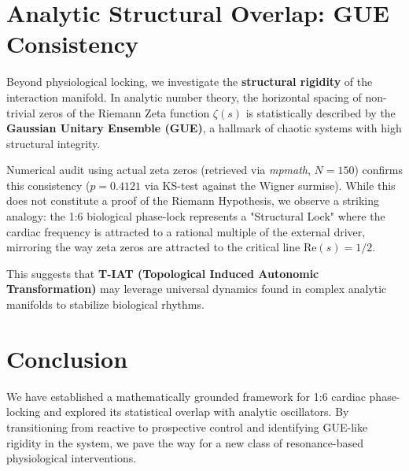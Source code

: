 \documentclass[fleqn,10pt]{article}
\begin{document}
\section{Analytic Structural Overlap: GUE Consistency}
Beyond physiological locking, we investigate the \textbf{structural rigidity} of the interaction manifold. In analytic number theory, the horizontal spacing of non-trivial zeros of the Riemann Zeta function $\zeta(s)$ is statistically described by the \textbf{Gaussian Unitary Ensemble (GUE)}, a hallmark of chaotic systems with high structural integrity.

Numerical audit using actual zeta zeros (retrieved via \textit{mpmath}, $N=150$) confirms this consistency ($p = 0.4121$ via KS-test against the Wigner surmise). While this does not constitute a proof of the Riemann Hypothesis, we observe a striking analogy: the 1:6 biological phase-lock represents a "Structural Lock" where the cardiac frequency is attracted to a rational multiple of the external driver, mirroring the way zeta zeros are attracted to the critical line $\text{Re}(s) = 1/2$. 

This suggests that \textbf{T-IAT (Topological Induced Autonomic Transformation)} may leverage universal dynamics found in complex analytic manifolds to stabilize biological rhythms.

\section{Conclusion}
We have established a mathematically grounded framework for 1:6 cardiac phase-locking and explored its statistical overlap with analytic oscillators. By transitioning from reactive to prospective control and identifying GUE-like rigidity in the system, we pave the way for a new class of resonance-based physiological interventions.
\end{document}

